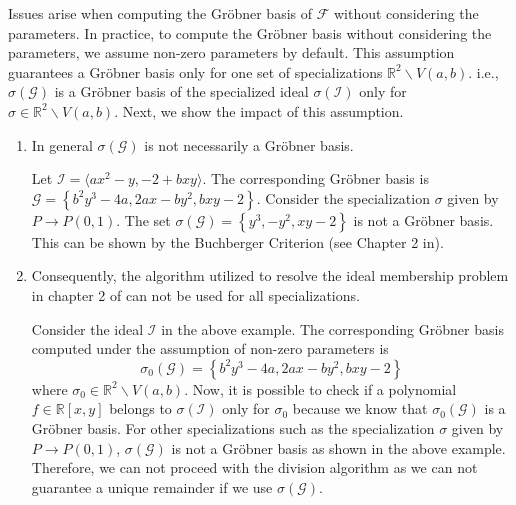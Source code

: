 \documentclass[runningheads]{llncs}
\newcommand{\Rr}{\mathbb{R}}
\newcommand{\1}{\chi}
\newcommand{\Ff}{\mathcal{F}}
\newcommand{\Gg}{\mathcal{G}}
\newcommand{\Ii}{\mathcal{I}}
\begin{document}
Issues arise when computing the Gr{\"o}bner basis of $\Ff$ without considering the parameters.
In practice, to compute the Gr{\"o}bner basis without considering the parameters, we assume non-zero parameters by default.
This assumption guarantees a Gr{\"o}bner basis only for one set of specializations $\Rr^2\backslash V(a,b)$. i.e., 
$\sigma(\Gg)$ is a Gr{\"o}bner basis of the specialized ideal $\sigma(\Ii)$ only for $\sigma \in \Rr^2\backslash V(a,b)$.
Next, we show the impact of this assumption.
\begin{enumerate}
    \item In general $\sigma\left(\Gg\right)$ is not necessarily a Gr{\"o}bner basis.
    \begin{example}
        \label{ex431}
        Let $\Ii=\langle 
           {a x^2 - y, -2 + b x y} \rangle$. The corresponding Gr{\"o}bner basis 
           is $\Gg=\left\{b^2 y^3-4 a,2 a x-b y^2,b x y-2\right\}$. Consider 
           the specialization $\sigma$ given by $P\rightarrow P(0,1)$.
           The set $\sigma(\Gg)=\left\{y^3,-y^2,x y-2\right\}$ is not a Gr{\"o}bner basis.
		   This can be shown by the Buchberger Criterion (see Chapter 2 in\cite{Cox}).

    \end{example}
    \item Consequently, the algorithm utilized to resolve the ideal membership 
    problem in chapter 2 of \cite{Cox} can not be used for all specializations. 
    
    \begin{example}
        \label{ex433}
        Consider the ideal $\Ii$ in the above example. The corresponding Gr{\"o}bner basis computed under the assumption of non-zero parameters
        is $$\sigma_0(\Gg)=\left\{b^2 y^3-4 a,2 a x-b y^2,b x y-2\right\}$$ where $\sigma_0 \in \Rr^2\backslash V(a,b)$. 
        Now, it is possible to check if a polynomial $f\in \Rr[x,y]$ belongs to $\sigma(\Ii)$ only for $\sigma_0 $     
        because we know that $\sigma_0(\Gg)$ is a Gr{\"o}bner basis. For other specializations such as 
        the specialization $\sigma$ given by $P\rightarrow P(0,1)$, $\sigma(\Gg)$ is not a Gr{\"o}bner basis as shown in the above example. 
        Therefore, we can not proceed with the division algorithm as we can not guarantee a unique remainder if we use $\sigma(\Gg)$.  
    \end{example}


\end{enumerate}
\end{document}
